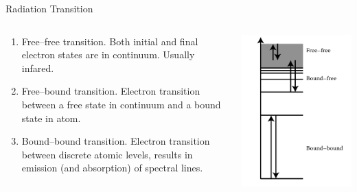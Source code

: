 \documentclass[final]{beamer}
\begin{document}
\begin{frame}{Radiation Transition}
  \begin{columns}%
  \begin{column}{0.6\textwidth}
  \begin{enumerate}
    \item Free--free transition. Both initial and final electron states are in continuum. Usually infared.
    \item Free--bound transition. Electron transition between a free state in continuum and a bound state in atom.
    \item Bound--bound transition. Electron transition between discrete atomic levels, results in emission (and absorption) of spectral lines.
  \end{enumerate}
  \end{column}
  \begin{column}{0.4\textwidth}
\includegraphics[width=\columnwidth]{figures/electron-transitions.png}
  \end{column}
  \end{columns}
\end{frame}
\end{document}
